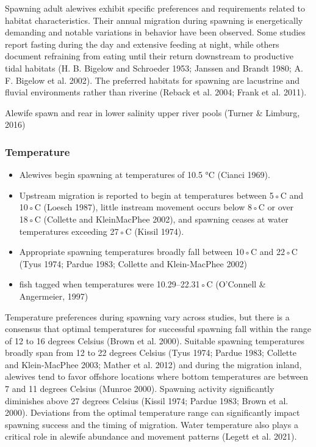 \documentclass[
]{book}
\providecommand{\tightlist}{%
  \setlength{\itemsep}{0pt}\setlength{\parskip}{0pt}}
\begin{document}
Spawning adult alewives exhibit specific preferences and requirements related to habitat characteristics.
Their annual migration during spawning is energetically demanding and notable variations in behavior have been observed.
Some studies report fasting during the day and extensive feeding at night, while others document refraining from eating until their return downstream to productive tidal habitats (H. B. Bigelow and Schroeder 1953; Janssen and Brandt 1980; A. F. Bigelow et al. 2002).
The preferred habitats for spawning are lacustrine and fluvial environments rather than riverine (Reback et al. 2004; Frank et al. 2011).

Alewife spawn and rear in lower salinity upper river pools (Turner \& Limburg, 2016)

\hypertarget{temperature}{%
\subsubsection{Temperature}\label{temperature}}

\begin{itemize}
\tightlist
\item
  Alewives begin spawning at temperatures of 10.5 °C (Cianci 1969).
\item
  Upstream migration is reported to begin at temperatures between 5◦C and 10◦C (Loesch 1987), little instream movement occurs below 8◦C or over 18◦C (Collette and KleinMacPhee 2002), and spawning ceases at water temperatures exceeding 27◦C (Kissil 1974).
\item
  Appropriate spawning temperatures broadly fall between 10◦C and 22◦C (Tyus 1974; Pardue 1983; Collette and Klein-MacPhee 2002)
\item
  fish tagged when temperatures were 10.29--22.31◦C (O'Connell \& Angermeier, 1997)
\end{itemize}

Temperature preferences during spawning vary across studies, but there is a consensus that optimal temperatures for successful spawning fall within the range of 12 to 16 degrees Celsius (Brown et al. 2000).
Suitable spawning temperatures broadly span from 12 to 22 degrees Celsius (Tyus 1974; Pardue 1983; Collette and Klein-MacPhee 2003; Mather et al. 2012) and during the migration inland, alewives tend to favor offshore locations where bottom temperatures are between 7 and 11 degrees Celsius (Munroe 2000).
Spawning activity significantly diminishes above 27 degrees Celsius (Kissil 1974; Pardue 1983; Brown et al. 2000).
Deviations from the optimal temperature range can significantly impact spawning success and the timing of migration.
Water temperature also plays a critical role in alewife abundance and movement patterns (Legett et al. 2021).
\end{document}
